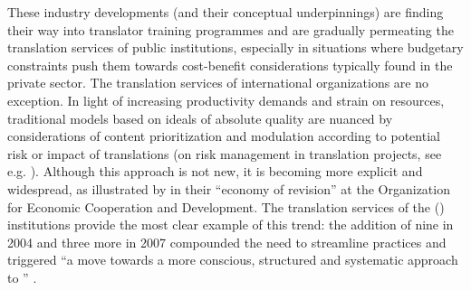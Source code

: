\documentclass[output=paper]{langsci/langscibook}
\begin{document}
These industry developments (and their conceptual underpinnings) are finding their way into translator training programmes and are gradually permeating the translation services of public institutions, especially in situations where budgetary constraints push them towards cost-benefit considerations typically found in the private sector. The translation services of international organizations are no exception. In light of increasing productivity demands and strain on resources, traditional models based on ideals of absolute quality are nuanced by  considerations of content prioritization and  modulation according to potential risk or impact of translations (on risk management in translation projects, see e.g. \citealt{Dunne2013,CanforaOttmann2015}). Although this approach is not new, it is becoming more explicit and widespread, as illustrated by \citet{Prioux2007} in their “economy of revision” at the Organization for Economic Cooperation and Development. The translation services of the  () institutions provide the most clear example of this trend: the addition of nine  in 2004 and three more in 2007 compounded the need to streamline practices and triggered “a move towards a more conscious, structured and systematic approach to ” \citep[52]{Strandvik2017}.
 
\end{document}
